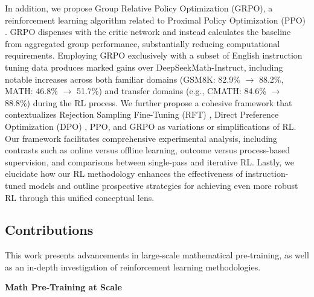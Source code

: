 In addition, we propose Group Relative Policy Optimization (GRPO), a reinforcement learning algorithm related to Proximal Policy Optimization (PPO) \citep{schulman2017proximal}. GRPO dispenses with the critic network and instead calculates the baseline from aggregated group performance, substantially reducing computational requirements. Employing GRPO exclusively with a subset of English instruction tuning data produces marked gains over DeepSeekMath-Instruct, including notable increases across both familiar domains (GSM8K: 82.9\% $\rightarrow$ 88.2\%, MATH: 46.8\% $\rightarrow$ 51.7\%) and transfer domains (e.g., CMATH: 84.6\% $\rightarrow$ 88.8\%) during the RL process. We further propose a cohesive framework that contextualizes Rejection Sampling Fine-Tuning (RFT) \citep{yuan2023scaling}, Direct Preference Optimization (DPO) \citep{dpo}, PPO, and GRPO as variations or simplifications of RL. Our framework facilitates comprehensive experimental analysis, including contrasts such as online versus offline learning, outcome versus process-based supervision, and comparisons between single-pass and iterative RL. Lastly, we elucidate how our RL methodology enhances the effectiveness of instruction-tuned models and outline prospective strategies for achieving even more robust RL through this unified conceptual lens.

\subsection{Contributions}
This work presents advancements in large-scale mathematical pre-training, as well as an in-depth investigation of reinforcement learning methodologies.

\textbf{Math Pre-Training at Scale}

